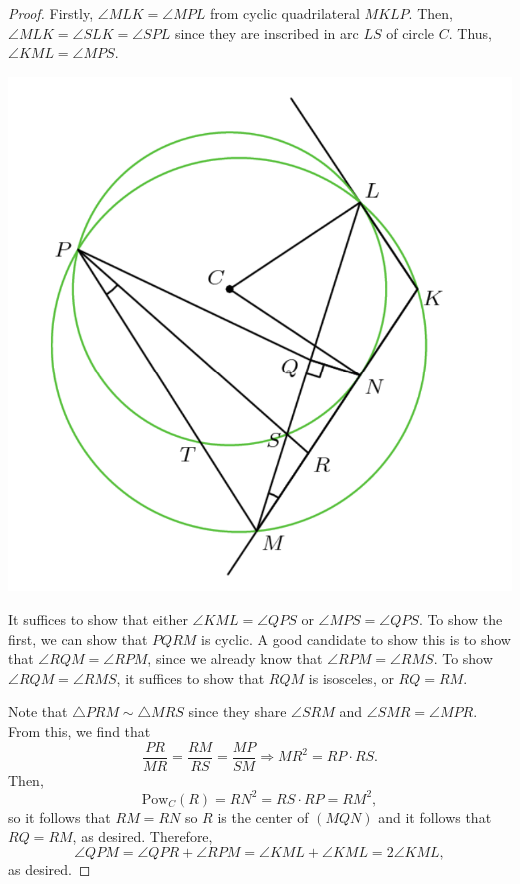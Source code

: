 \documentclass[12pt]{scrartcl}
\newcommand{\<}{\langle}
\renewcommand{\>}{\rangle}
\begin{document}
\begin{proof}
Firstly, $\angle MLK = \angle MPL$ from cyclic quadrilateral $MKLP$.  Then, $\angle MLK = \angle SLK = \angle SPL$ since they are inscribed in arc $LS$ of circle $C$.  Thus, $\angle KML = \angle MPS$.
\begin{center}
\includegraphics[scale=0.6]{graphics/p2-7.png}
\end{center}
It suffices to show that either $\angle KML = \angle QPS$ or $\angle MPS = \angle QPS$.  To show the first, we can show that $PQRM$ is cyclic.  A good candidate to show this is to show that $\angle RQM = \angle RPM$, since we already know that $\angle RPM = \angle RMS$.    To show $\angle RQM = \angle RMS$, it suffices to show that $RQM$ is isosceles, or $RQ = RM$.  

Note that $\triangle PRM \sim \triangle MRS$ since they share $\angle SRM$ and $\angle SMR = \angle MPR$.  From this, we find that 
$$\frac{PR}{MR} = \frac{RM}{RS} = \frac{MP}{SM} \Longrightarrow MR^2 = RP \cdot RS.$$
Then,
$$\text{Pow}_C(R) = RN^2 = RS \cdot RP = RM^2,$$
so it follows that $RM = RN$ so $R$ is the center of $(MQN)$ and it follows that $RQ = RM$, as desired.  Therefore,
$$\angle QPM = \angle QPR + \angle RPM = \angle KML + \angle KML = 2\angle KML,$$
as desired.
\end{proof}
\end{document}
